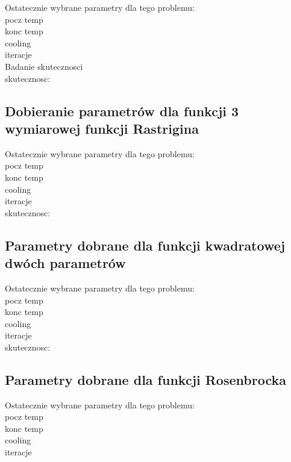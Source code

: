 \documentclass[twoside]{projektInzynierskiMS1}
\begin{document}
Ostatecznie wybrane parametry dla tego problemu:\\
pocz temp\\
konc temp\\
cooling\\
iteracje\\

Badanie skutecznosci \\






skutecznosc:\\






	\subsection{Dobieranie parametrów dla funkcji 3 wymiarowej funkcji Rastrigina}
Ostatecznie wybrane parametry dla tego problemu:\\
pocz temp\\
konc temp\\
cooling\\
iteracje\\






skutecznosc:\\


	\subsection{Parametry dobrane dla funkcji kwadratowej dwóch parametrów}
Ostatecznie wybrane parametry dla tego problemu:\\
pocz temp\\
konc temp\\
cooling\\
iteracje\\






skutecznosc:\\

	\subsection{Parametry dobrane dla funkcji Rosenbrocka}
Ostatecznie wybrane parametry dla tego problemu:\\
pocz temp\\
konc temp\\
cooling\\
iteracje\\
\end{document}
